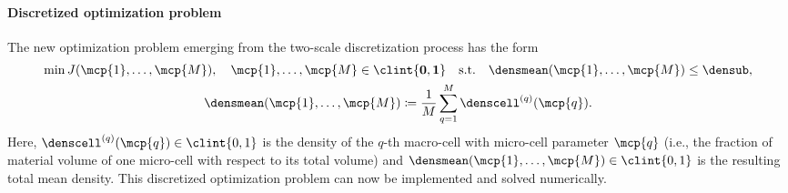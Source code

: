 \vspace{-0.5em}

\paragraph{Discretized optimization problem}

The new optimization problem emerging from the
two-scale discretization process has the form
\begin{subequations}
  \label{eq:topoOptProblemDiscrete}
  \setlength{\belowdisplayskip}{5pt}%
  \begin{gather}
    \min J(\mcp{1}, \dotsc, \mcp{M}),\quad
    \mcp{1}, \dotsc, \mcp{M} \in \clint{\*0, \*1}
    \quad\text{s.t.}\quad
    \densmean(\mcp{1}, \dotsc, \mcp{M}) \le \densub,\\
    \densmean(\mcp{1}, \dotsc, \mcp{M})
    \ceq \frac{1}{M} \sum_{q=1}^M \denscell^{(q)}(\mcp{q}).
  \end{gather}
\end{subequations}
Here, $\denscell^{(q)}(\mcp{q}) \in \clint{0, 1}$ is the
density of the $q$-th macro-cell with micro-cell parameter $\mcp{q}$
(i.e., the fraction of material volume of one micro-cell
with respect to its total volume)
and $\densmean(\mcp{1}, \dotsc, \mcp{M}) \in \clint{0, 1}$
is the resulting total mean density.
This discretized optimization problem can now be implemented and
solved numerically.
